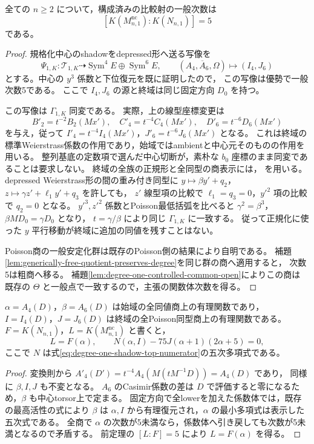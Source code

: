 \begin{theorem}[次数1の全Poisson比較の一般次数]
\label{thm:degree-one-shadow-degree-five}
全ての $n\ge2$ について，構成済みの比較射の一般次数は
\[
       [K(M^{\mathrm{nc}}_{n,1}):K(N_{n,1})]=5
\]
である。
\end{theorem}
\begin{proof}
規格化中心のshadowをdepressed形へ送る写像を
\[
 \Psi_{1,K}:\mathcal T_{1,K}\dashrightarrow
           \operatorname{Sym}^4E\oplus\operatorname{Sym}^6E,
 \qquad (A_4,\overline A_6,\Omega)\longmapsto(I_4,J_6)
\]
とする。中心の $y^3$ 係数と下位復元を既に証明したので，
この写像は優勢で一般次数5である。
ここで $I_4,J_6$ の源と終域は同じ固定方向 $D_0$ を持つ。

この写像は $\Gamma_{1,K}$ 同変である。
実際，上の線型座標変更は
\[
 B'_2=t^{-2}B_2(Mx'),\quad
 C'_4=t^{-4}C_4(Mx'),\quad D'_6=t^{-6}D_6(Mx')
\]
を与え，従って
$I'_4=t^{-4}I_4(Mx')$，$J'_6=t^{-6}J_6(Mx')$ となる。
これは終域の標準Weierstrass係数の作用であり，始域ではambientと中心元そのものの作用を用いる。
整列基底の定数項で選んだ中心切断が，素朴な $b_0$ 座標のまま同変であることは要求しない。
終域の全族の正規形と全同型の商表示には，
\cite[定理8.8]{PoissonDP}を用いる。
depressed Weierstrass形の間の重み付き同型に
$y\mapsto\beta y'+q_2$，$z\mapsto\gamma z'+\ell_1y'+q_3$ を許しても，
$z'$ 線型項の比較で $\ell_1=q_3=0$，$y'^2$ 項の比較で $q_2=0$ となる。
$y'^3,z'^2$ 係数とPoisson最低括弧を比べると
$\gamma^2=\beta^3$，$\beta MD_0=\gamma D_0$ となり，
$t=\gamma/\beta$ により同じ $\Gamma_{1,K}$ に一致する。
従って正規化に使った $y$ 平行移動が終域に追加の同値を残すことはない。

Poisson商の一般安定化群は既存のPoisson側の結果により自明である。
補題\ref{lem:generically-free-quotient-preserves-degree}を同じ群の商へ適用すると，
次数5は粗商へ移る。
補題\ref{lem:degree-one-controlled-common-open}によりこの商は
既存の $\Theta$ と一般点で一致するので，主張の関数体次数を得る。
\end{proof}

\begin{proposition}[内在的な最高活性係数と逆五次方程式]
\label{prop:degree-one-intrinsic-inverse-quintic}
$\alpha=A_4(D)$，$\beta=A_6(D)$ は始域の全同値商上の有理関数であり，
$I=I_4(D)$，$J=J_6(D)$ は終域の全Poisson同型商上の有理関数である。
$F=K(N_{n,1})$，$L=K(M^{\mathrm{nc}}_{n,1})$ と書くと，
\[
 L=F(\alpha),\qquad
 N(\alpha,I)-75J(\alpha+1)(2\alpha+5)=0,
\]
ここで $N$ は式\eqref{eq:degree-one-shadow-top-numerator}の五次多項式である。
\end{proposition}
\begin{proof}
変換則から $A'_4(D')=t^{-4}A_4(M(tM^{-1}D))=A_4(D)$ であり，
同様に $\beta,I,J$ も不変となる。
$A_6$ のCasimir係数の差は $D$ で評価すると零になるため，$\beta$ も中心torsor上で定まる。
固定方向で全lowerを加えた係数体では，既存の最高活性の式により
$\beta$ は $\alpha,I$ から有理復元され，$\alpha$ の最小多項式は表示した五次式である。
全商で $\alpha$ の次数が5未満なら，係数体へ引き戻しても次数が5未満となるので矛盾する。
前定理の $[L:F]=5$ により $L=F(\alpha)$ を得る。
\end{proof}

